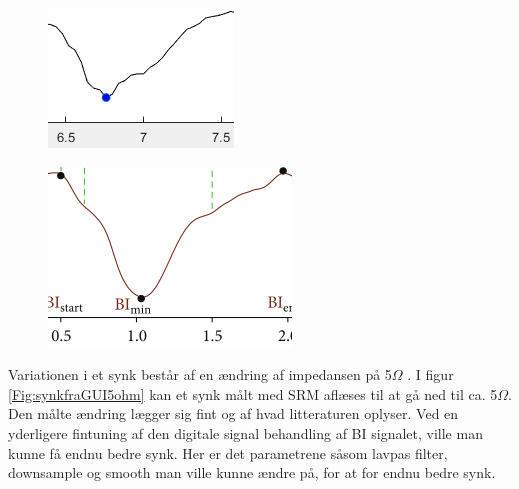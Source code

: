 \begin{figure}[H]
\centering
\begin{minipage}{.5\textwidth}
  \centering
  \includegraphics[width=.8\linewidth]{Figure/synkfraGUI}
  \label{fig:synkfraGUI}
\end{minipage}%
\begin{minipage}{.5\textwidth}
  \centering
  \includegraphics[width=.8\linewidth]{Figure/synkfraArtikel}
  \label{fig:synkfraArtikel}
\end{minipage}
\end{figure}

Variationen i et synk består af en ændring af impedansen på 5$\Omega$ \cite[s. 49]{Chester2014}. I figur \ref{Fig:synkfraGUI5ohm} kan et synk målt med SRM aflæses til at gå ned til ca. 5$\Omega$. Den målte ændring lægger sig fint og af hvad litteraturen oplyser. Ved en yderligere fintuning af den digitale signal behandling af BI signalet, ville man kunne få endnu bedre synk. Her er det parametrene såsom lavpas filter, downsample og smooth man ville kunne ændre på, for at for endnu bedre synk.

